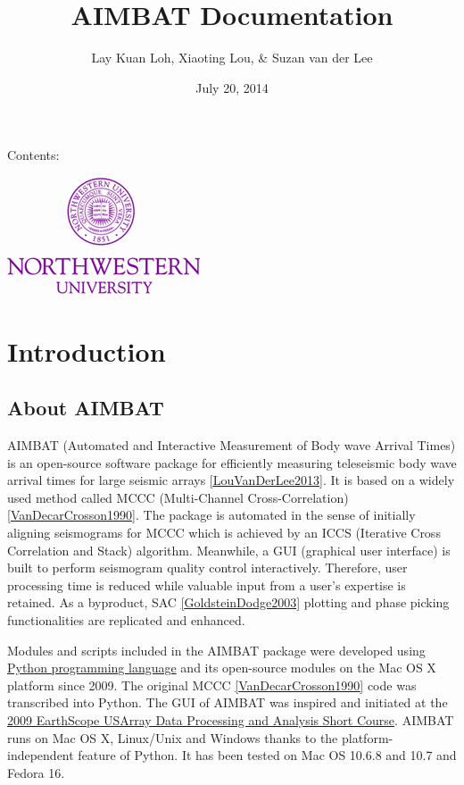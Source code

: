 \documentclass[letterpaper,10pt,english]{sphinxmanual}
\title{AIMBAT Documentation}
\date{July 20, 2014}
\author{Lay Kuan Loh, Xiaoting Lou, \& Suzan van der Lee}
\begin{document}
\maketitle
\tableofcontents
{}\label{index::doc}


Contents:

\includegraphics{NU_Logo_purple.jpg}


\chapter{Introduction}
\label{docfiles/introduction:introduction}\label{docfiles/introduction:welcome-to-aimbat-s-documentation}\label{docfiles/introduction::doc}

\section{About AIMBAT}
\label{docfiles/introduction:about-aimbat}
AIMBAT (Automated and Interactive Measurement of Body wave Arrival Times) is an open-source software package for efficiently measuring teleseismic body wave arrival times for large seismic arrays {\hyperref[docfiles/citations:louvanderlee2013]{{[}LouVanDerLee2013{]}}}. It is based on a widely used method called MCCC (Multi-Channel Cross-Correlation) {\hyperref[docfiles/citations:vandecarcrosson1990]{{[}VanDecarCrosson1990{]}}}. The package is automated in the sense of initially aligning seismograms for MCCC which is achieved by an ICCS (Iterative Cross Correlation and Stack) algorithm. Meanwhile, a GUI (graphical user interface) is built to perform seismogram quality control interactively. Therefore, user processing time is reduced while valuable input from a user's expertise is retained. As a byproduct, SAC {\hyperref[docfiles/citations:goldsteindodge2003]{{[}GoldsteinDodge2003{]}}} plotting and phase picking functionalities are replicated and enhanced.

Modules and scripts included in the AIMBAT package were developed using \href{http://www.python.org/}{Python programming language} and its open-source modules on the Mac OS X platform since 2009. The original MCCC {\hyperref[docfiles/citations:vandecarcrosson1990]{{[}VanDecarCrosson1990{]}}} code was transcribed into Python. The GUI of AIMBAT was inspired and initiated at the \href{http://www.iris.edu/hq/es\_course/content/2009.html}{2009 EarthScope USArray Data Processing and Analysis Short Course}. AIMBAT runs on Mac OS X, Linux/Unix and Windows thanks to the platform-independent feature of Python. It has been tested on Mac OS 10.6.8 and 10.7 and Fedora 16.
\end{document}
